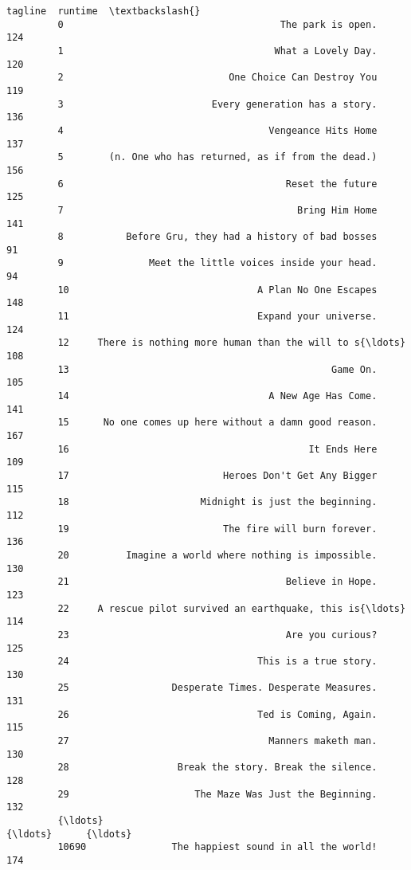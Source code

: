 \documentclass[11pt]{article}
\begin{document}
\begin{Verbatim}[commandchars=\\\{\}]
                                                          tagline  runtime  \textbackslash{}
         0                                      The park is open.      124   
         1                                     What a Lovely Day.      120   
         2                             One Choice Can Destroy You      119   
         3                          Every generation has a story.      136   
         4                                    Vengeance Hits Home      137   
         5        (n. One who has returned, as if from the dead.)      156   
         6                                       Reset the future      125   
         7                                         Bring Him Home      141   
         8           Before Gru, they had a history of bad bosses       91   
         9               Meet the little voices inside your head.       94   
         10                                 A Plan No One Escapes      148   
         11                                 Expand your universe.      124   
         12     There is nothing more human than the will to s{\ldots}      108   
         13                                              Game On.      105   
         14                                   A New Age Has Come.      141   
         15      No one comes up here without a damn good reason.      167   
         16                                          It Ends Here      109   
         17                           Heroes Don't Get Any Bigger      115   
         18                       Midnight is just the beginning.      112   
         19                           The fire will burn forever.      136   
         20          Imagine a world where nothing is impossible.      130   
         21                                      Believe in Hope.      123   
         22     A rescue pilot survived an earthquake, this is{\ldots}      114   
         23                                      Are you curious?      125   
         24                                 This is a true story.      130   
         25                  Desperate Times. Desperate Measures.      131   
         26                                 Ted is Coming, Again.      115   
         27                                   Manners maketh man.      130   
         28                   Break the story. Break the silence.      128   
         29                      The Maze Was Just the Beginning.      132   
         {\ldots}                                                  {\ldots}      {\ldots}   
         10690               The happiest sound in all the world!      174   

\end{Verbatim}
\end{document}
